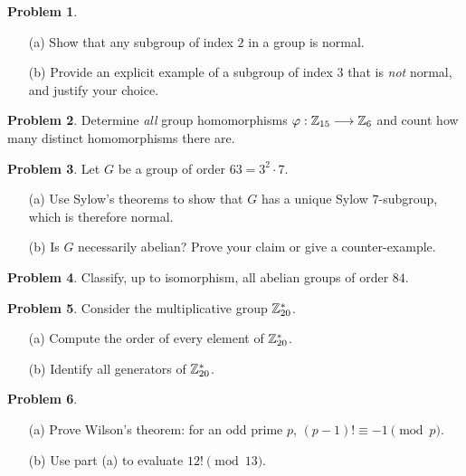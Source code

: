 \documentclass[12pt]{article}
\theoremstyle{definition} %
\newtheorem{problem}{Problem}
\theoremstyle{plain} %
\begin{document}
\bigskip
\begin{problem}
  \begin{enumerate}
      \item[(a)] Show that any subgroup of index \(2\) in a group is normal.
      \item[(b)] Provide an explicit example of a subgroup of index \(3\)
                that is \emph{not} normal, and justify your choice.
  \end{enumerate}
\end{problem}

\bigskip
\begin{problem}
  Determine \emph{all} group homomorphisms
  \(\varphi:\mathbb Z_{15}\longrightarrow\mathbb Z_{6}\)
  and count how many distinct homomorphisms there are.
\end{problem}

\bigskip
\begin{problem}
  Let \(G\) be a group of order \(63=3^{2}\cdot7\).
  \begin{enumerate}
      \item[(a)] Use Sylow’s theorems to show that \(G\) has a unique
                Sylow \(7\)-subgroup, which is therefore normal.
      \item[(b)] Is \(G\) necessarily abelian?  Prove your claim or give a
                counter-example.
  \end{enumerate}
\end{problem}

\bigskip
\begin{problem}
  Classify, up to isomorphism, all abelian groups of order \(84\).
\end{problem}

\bigskip
\begin{problem}
  Consider the multiplicative group \(\mathbb Z_{20}^{\ast}\).
  \begin{enumerate}
      \item[(a)] Compute the order of every element of \(\mathbb Z_{20}^{\ast}\).
      \item[(b)] Identify all generators of \(\mathbb Z_{20}^{\ast}\).
  \end{enumerate}
\end{problem}

\bigskip
\begin{problem}
  \begin{enumerate}
      \item[(a)] Prove Wilson’s theorem: for an odd prime \(p\),
                \((p-1)!\equiv -1\pmod{p}\).
      \item[(b)] Use part (a) to evaluate \(12!\pmod{13}\).
  \end{enumerate}
\end{problem}
\end{document}
